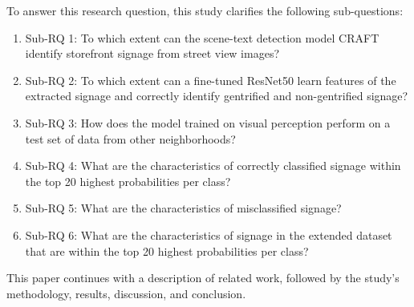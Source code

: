 To answer this research question, this study clarifies the following sub-questions: 

\begin{enumerate}
    \item Sub-RQ 1: To which extent can the scene-text detection model CRAFT identify storefront signage from street view images?
    \item Sub-RQ 2: To which extent can a fine-tuned ResNet50 learn features of the extracted signage and correctly identify gentrified and non-gentrified signage?
    \item Sub-RQ 3: How does the model trained on visual perception perform on a test set of data from other neighborhoods?
    \item Sub-RQ 4: What are the characteristics of correctly classified signage within the top 20 highest probabilities per class?
    \item Sub-RQ 5: What are the characteristics of misclassified signage?
    \item Sub-RQ 6: What are the characteristics of signage in the extended dataset that are within the top 20 highest probabilities per class?
\end{enumerate}

This paper continues with a description of related work, followed by the study's methodology, results, discussion, and conclusion.